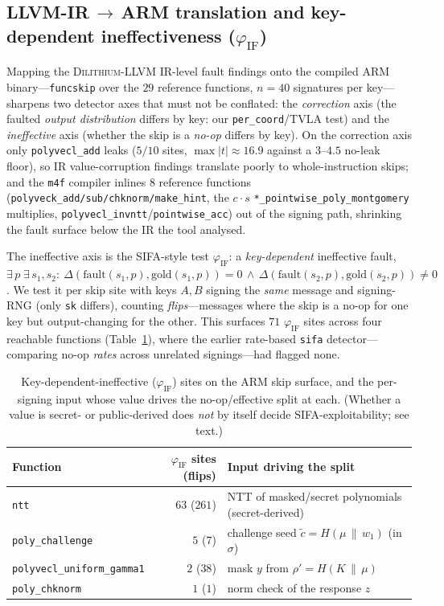 \documentclass[11pt]{article}
\newcommand{\code}[1]{\texttt{#1}}
\begin{document}
\subsection{LLVM-IR\,$\to$\,ARM translation and key-dependent ineffectiveness
($\varphi_{\mathrm{IF}}$)}\label{sec:llvmstudy}
Mapping the \textsc{Dilithium-LLVM} IR-level fault findings onto the compiled ARM
binary---\code{funcskip} over the $29$ reference functions, $n{=}40$ signatures per
key---sharpens two detector axes that must not be conflated: the \emph{correction}
axis (the faulted \emph{output distribution} differs by key: our \code{per\_coord}/TVLA
test) and the \emph{ineffective} axis (whether the skip is a \emph{no-op} differs by
key). On the correction axis only \code{polyvecl\_add} leaks ($5/10$ sites,
$\max|t|\approx16.9$ against a $3$--$4.5$ no-leak floor), so IR value-corruption
findings translate poorly to whole-instruction skips; and the \code{m4f} compiler
inlines $8$ reference functions (\code{polyveck\_add/sub/chknorm/make\_hint}, the
$c\cdot s$ \code{*\_pointwise\_poly\_montgomery} multiplies,
\code{polyvecl\_invntt}/\code{pointwise\_acc}) out of the signing path, shrinking the
fault surface below the IR the tool analysed.

The ineffective axis is the SIFA-style test $\varphi_{\mathrm{IF}}$: a
\emph{key-dependent} ineffective fault,
$\exists\,p\;\exists\,s_1,s_2:\ \Delta(\mathrm{fault}(s_1,p),\mathrm{gold}(s_1,p)){=}0
\,\wedge\, \Delta(\mathrm{fault}(s_2,p),\mathrm{gold}(s_2,p)){\neq}0$. We test it per
skip site with keys $A,B$ signing the \emph{same} message and signing-RNG (only
\code{sk} differs), counting \emph{flips}---messages where the skip is a no-op for one
key but output-changing for the other. This surfaces $71$ $\varphi_{\mathrm{IF}}$ sites
across four reachable functions (Table~\ref{tab:phiif}), where the earlier rate-based
\code{sifa} detector---comparing no-op \emph{rates} across unrelated signings---had
flagged none.

\begin{table}[h]
\centering\footnotesize
\caption{Key-dependent-ineffective ($\varphi_{\mathrm{IF}}$) sites on the ARM skip
surface, and the per-signing input whose value drives the no-op/effective split at
each. (Whether a value is secret- or public-derived does \emph{not} by itself decide
SIFA-exploitability; see text.)}
\label{tab:phiif}
\begin{tabular}{@{}lrl@{}}
\toprule
Function & $\varphi_{\mathrm{IF}}$ sites (flips) & Input driving the split \\
\midrule
\code{ntt} & $63$ ($261$) & NTT of masked/secret polynomials (secret-derived) \\
\code{poly\_challenge} & $5$ ($7$) & challenge seed $\tilde c = H(\mu\,\|\,w_1)$ (in $\sigma$) \\
\code{polyvecl\_uniform\_gamma1} & $2$ ($38$) & mask $y$ from $\rho'{=}H(K\,\|\,\mu)$ \\
\code{poly\_chknorm} & $1$ ($1$) & norm check of the response $z$ \\
\bottomrule
\end{tabular}
\end{table}
\end{document}
